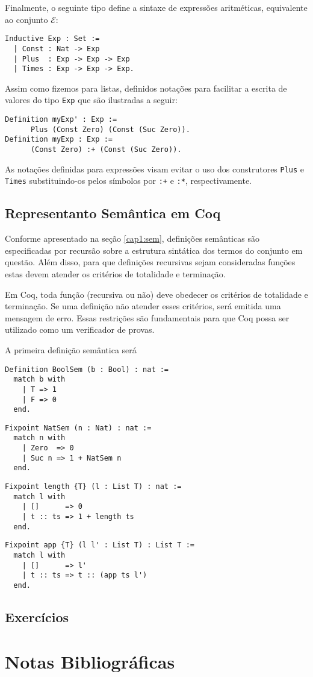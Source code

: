 Finalmente, o seguinte tipo define a  sintaxe de express\~oes aritm\'eticas, equivalente ao conjunto $\mathcal{E}$:
\begin{lstlisting}
Inductive Exp : Set :=
  | Const : Nat -> Exp
  | Plus  : Exp -> Exp -> Exp
  | Times : Exp -> Exp -> Exp.
\end{lstlisting}
Assim como fizemos para listas, definidos nota\c{c}\~oes para facilitar a escrita de valores do tipo \texttt{Exp} que s\~ao ilustradas a seguir:
\begin{lstlisting}
Definition myExp' : Exp := 
      Plus (Const Zero) (Const (Suc Zero)).
Definition myExp : Exp := 
      (Const Zero) :+ (Const (Suc Zero)).
\end{lstlisting}
As nota\c{c}\~oes definidas para express\~oes visam evitar o uso dos construtores \texttt{Plus} e \texttt{Times} substituindo-os pelos s\'imbolos
por \texttt{:+} e \texttt{:*}, respectivamente.

\subsection{Representanto Sem\^antica em Coq}

Conforme apresentado na se\c{c}\~ao \ref{cap1:sem}, defini\c{c}\~oes sem\^anticas s\~ao especificadas por recurs\~ao sobre a estrutura sint\'atica
dos termos do conjunto em quest\~ao. Al\'em disso, para que defini\c{c}\~oes recursivas sejam consideradas fun\c{c}\~oes estas devem atender
os crit\'erios de totalidade e termina\c{c}\~ao.

Em Coq, toda fun\c{c}\~ao (recursiva ou n\~ao) deve obedecer os crit\'erios de totalidade e termina\c{c}\~ao. Se uma defini\c{c}\~ao 
n\~ao atender esses crit\'erios, ser\'a emitida uma mensagem de erro. Essas restri\c{c}\~oes s\~ao fundamentais para que Coq possa ser 
utilizado como um verificador de provas.

A primeira defini\c{c}\~ao sem\^antica ser\'a

\begin{lstlisting}
Definition BoolSem (b : Bool) : nat :=
  match b with
    | T => 1
    | F => 0
  end.
\end{lstlisting}

\begin{lstlisting}
Fixpoint NatSem (n : Nat) : nat :=
  match n with
    | Zero  => 0
    | Suc n => 1 + NatSem n
  end.
\end{lstlisting}

\begin{lstlisting}
Fixpoint length {T} (l : List T) : nat :=
  match l with
    | []      => 0
    | t :: ts => 1 + length ts
  end.
\end{lstlisting}

\begin{lstlisting}
Fixpoint app {T} (l l' : List T) : List T :=
  match l with
    | []      => l'
    | t :: ts => t :: (app ts l')
  end.
\end{lstlisting}

\subsection{Exerc\'icios}

\section{Notas Bibliogr\'aficas}